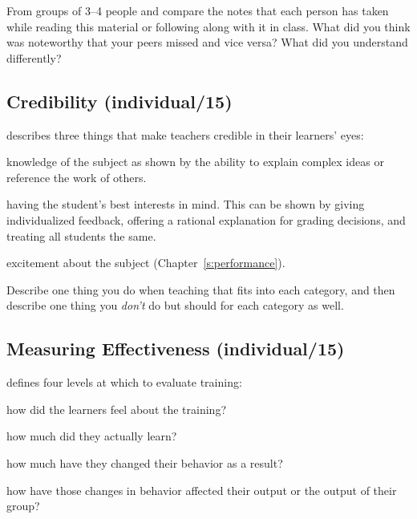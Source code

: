 From groups of 3--4 people and compare the notes that each person has
taken while reading this material or following along with it in class.
What did you think was noteworthy that your peers missed and vice versa?
What did you understand differently?

\subsection{Credibility (individual/15)}\label{credibility-individual15}

\cite{Fink2013} describes three things that make teachers credible in
their learners' eyes:

\begin{description}
\tightlist
\item[Competence:]
knowledge of the subject as shown by the ability to explain complex
ideas or reference the work of others.
\item[Trustworthiness:]
having the student's best interests in mind. This can be shown by
giving individualized feedback, offering a rational explanation for
grading decisions, and treating all students the same.
\item[Dynamism:]
excitement about the subject (Chapter~\ref{s:performance}).
\end{description}

Describe one thing you do when teaching that fits into each category,
and then describe one thing you \emph{don't} do but should for each category
as well.

\subsection{Measuring Effectiveness (individual/15)}\label{measuring-effectiveness-individual15}

\cite{Kirk1994} defines four levels at which to evaluate training:

\begin{description}
\tightlist
\item[Reaction:]
how did the learners feel about the training?
\item[Learning:]
how much did they actually learn?
\item[Behavior:]
how much have they changed their behavior as a result?
\item[Results:]
how have those changes in behavior affected their output or the
output of their group?
\end{description}

